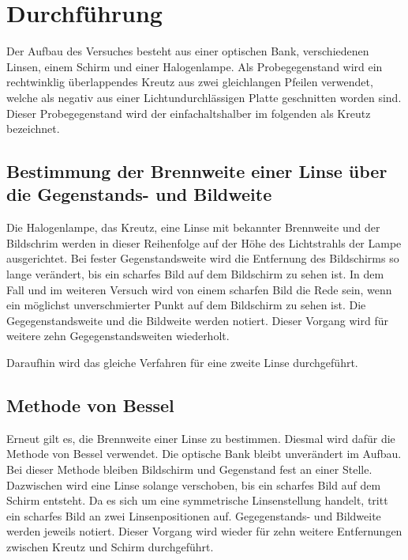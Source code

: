 \section{Durchführung}
\label{sec:Durchführung}
Der Aufbau des Versuches besteht aus einer optischen Bank, verschiedenen Linsen, einem Schirm und einer Halogenlampe. Als Probegegenstand wird ein rechtwinklig überlappendes Kreutz aus zwei gleichlangen Pfeilen verwendet, welche als negativ aus einer Lichtundurchlässigen Platte geschnitten worden sind. Dieser Probegegenstand wird der einfachaltshalber im folgenden als \glqq Kreutz\grqq{} bezeichnet.

\subsection{Bestimmung der Brennweite einer Linse über die Gegenstands- und Bildweite} %
\label{sub:Bestimmung der Brennweite einer Linse}
Die Halogenlampe, das Kreutz, eine Linse mit bekannter Brennweite und der Bildschrim werden in dieser Reihenfolge auf der Höhe des Lichtstrahls der Lampe ausgerichtet. Bei fester Gegenstandsweite wird die Entfernung des Bildschirms so lange verändert, bis ein scharfes Bild auf dem Bildschirm zu sehen ist. In dem Fall und im weiteren Versuch wird von einem scharfen Bild die Rede sein, wenn ein möglichst unverschmierter Punkt auf dem Bildschirm zu sehen ist. Die Gegegenstandsweite und die Bildweite werden notiert.
Dieser Vorgang wird für weitere zehn Gegegenstandsweiten wiederholt. 


Daraufhin wird das gleiche Verfahren für eine zweite Linse durchgeführt.


\subsection{Methode von Bessel} %
\label{sub:Methode von Bessel}
Erneut gilt es, die Brennweite einer Linse zu bestimmen. Diesmal wird dafür die Methode von Bessel verwendet. Die optische Bank bleibt unverändert im Aufbau. Bei dieser Methode bleiben Bildschirm und Gegenstand fest an einer Stelle. Dazwischen wird eine Linse solange verschoben, bis ein scharfes Bild auf dem Schirm entsteht. Da es sich um eine symmetrische Linsenstellung handelt, tritt ein scharfes Bild an zwei Linsenpositionen auf. Gegegenstands- und Bildweite werden jeweils notiert. Dieser Vorgang wird wieder für zehn weitere Entfernungen zwischen Kreutz und Schirm durchgeführt.

